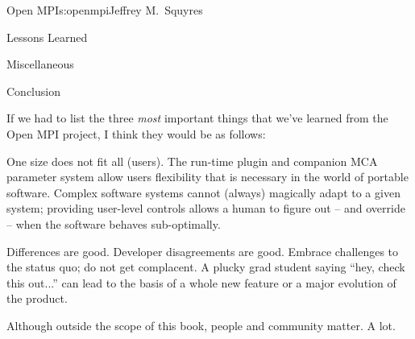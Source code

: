 \begin{aosachapter}{Open MPI}{s:openmpi}{Jeffrey M.\ Squyres}
\begin{aosasect1}{Lessons Learned}
\begin{aosasect2}{Miscellaneous}
\begin{aosaitemize}
\end{aosaitemize}

\end{aosasect2}


\begin{aosasect2}{Conclusion}

If we had to list the three \emph{most} important things that we've
learned from the Open MPI project, I think they would be as follows:

\begin{aosaitemize}
\item One size does not fit all (users).  The run-time plugin and
  companion MCA parameter system allow users flexibility that is
  necessary in the world of portable software.  Complex software
  systems cannot (always) magically adapt to a given system; providing
  user-level controls allows a human to figure out -- and override --
  when the software behaves sub-optimally.

\item Differences are good.  Developer disagreements are good.
  Embrace challenges to the status quo; do not get complacent.  A
  plucky grad student saying ``hey, check this out...'' can lead to
  the basis of a whole new feature or a major evolution of the
  product.

\item Although outside the scope of this book, people and community
  matter.  A lot.
\end{aosaitemize}

\end{aosasect2}

\end{aosasect1}

\end{aosachapter}

